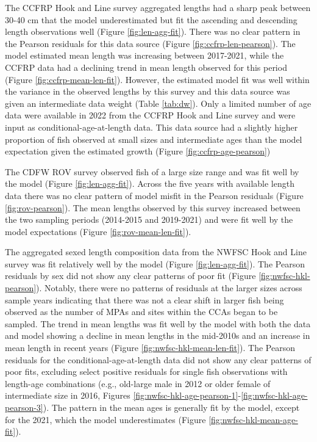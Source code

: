 \documentclass[11pt,
  english,
  letterpaper,
]{article}
\begin{document}
The CCFRP Hook and Line survey aggregated lengths had a sharp peak between 30-40 cm that the model underestimated but fit the ascending and descending length observations well (Figure \ref{fig:len-agg-fit}). There was no clear pattern in the Pearson residuals for this data source (Figure \ref{fig:ccfrp-len-pearson}). The model estimated mean length was increasing between 2017-2021, while the CCFRP data had a declining trend in mean length observed for this period (Figure \ref{fig:ccfrp-mean-len-fit}). However, the estimated model fit was well within the variance in the observed lengths by this survey and this data source was given an intermediate data weight (Table \ref{tab:dw}). Only a limited number of age data were available in 2022 from the CCFRP Hook and Line survey and were input as conditional-age-at-length data. This data source had a slightly higher proportion of fish observed at small sizes and intermediate ages than the model expectation given the estimated growth (Figure \ref{fig:ccfrp-age-pearson})

The CDFW ROV survey observed fish of a large size range and was fit well by the model (Figure \ref{fig:len-agg-fit}). Across the five years with available length data there was no clear pattern of model misfit in the Pearson residuals (Figure \ref{fig:rov-pearson}). The mean lengths observed by this survey increased between the two sampling periods (2014-2015 and 2019-2021) and were fit well by the model expectations (Figure \ref{fig:rov-mean-len-fit}).

The aggregated sexed length composition data from the NWFSC Hook and Line survey was fit relatively well by the model (Figure \ref{fig:len-agg-fit}). The Pearson residuals by sex did not show any clear patterns of poor fit (Figure \ref{fig:nwfsc-hkl-pearson}). Notably, there were no patterns of residuals at the larger sizes across sample years indicating that there was not a clear shift in larger fish being observed as the number of MPAs and sites within the CCAs began to be sampled. The trend in mean lengths was fit well by the model with both the data and model showing a decline in mean lengths in the mid-2010s and an increase in mean length in recent years (Figure \ref{fig:nwfsc-hkl-mean-len-fit}). The Pearson residuals for the conditional-age-at-length data did not show any clear patterns of poor fits, excluding select positive residuals for single fish observations with length-age combinations (e.g., old-large male in 2012 or older female of intermediate size in 2016, Figures \ref{fig:nwfsc-hkl-age-pearson-1}-\ref{fig:nwfsc-hkl-age-pearson-3}). The pattern in the mean ages is generally fit by the model, except for the 2021, which the model underestimates (Figure \ref{fig:nwfsc-hkl-mean-age-fit}).
\end{document}
